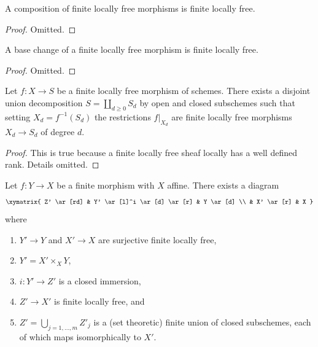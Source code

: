 \begin{lemma}
\label{lemma-composition-finite-locally-free}
A composition of finite locally free morphisms is finite locally free.
\end{lemma}

\begin{proof}
Omitted.
\end{proof}

\begin{lemma}
\label{lemma-base-change-finite-locally-free}
A base change of a finite locally free morphism is finite locally free.
\end{lemma}

\begin{proof}
Omitted.
\end{proof}

\begin{lemma}
\label{lemma-finite-locally-free}
Let $f : X \to S$ be a finite locally free morphism of schemes.
There exists a disjoint union decomposition
$S = \coprod_{d \geq 0} S_d$ by open and closed subschemes
such that setting $X_d = f^{-1}(S_d)$ the restrictions
$f|_{X_d}$ are finite locally free morphisms $X_d \to S_d$
of degree $d$.
\end{lemma}

\begin{proof}
This is true because a finite locally free sheaf locally has
a well defined rank. Details omitted.
\end{proof}

\begin{lemma}
\label{lemma-massage-finite}
Let $f : Y \to X$ be a finite morphism with $X$ affine.
There exists a diagram
$$
\xymatrix{
Z' \ar[rd] &
Y' \ar[l]^i \ar[d] \ar[r] &
Y \ar[d] \\
 & X' \ar[r] & X
}
$$
where
\begin{enumerate}
\item $Y' \to Y$ and $X' \to X$ are surjective finite locally free,
\item $Y' = X' \times_X Y$,
\item $i : Y' \to Z'$ is a closed immersion,
\item $Z' \to X'$ is finite locally free, and
\item $Z' = \bigcup_{j = 1, \ldots, m} Z'_j$ is a (set theoretic)
finite union of closed subschemes, each of which maps isomorphically
to $X'$.
\end{enumerate}
\end{lemma}

